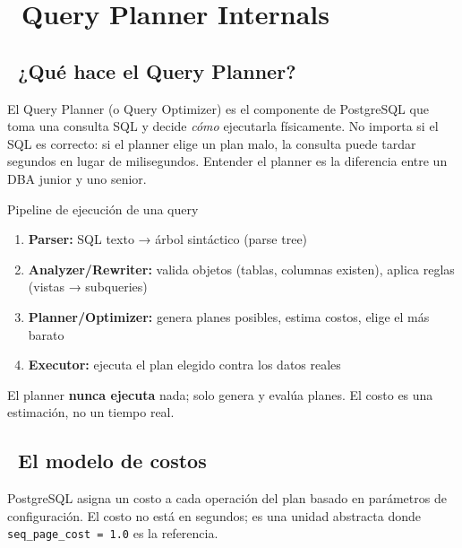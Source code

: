 \chapter[Query Planner Internals]{~Query Planner Internals}

\section[¿Qué hace el Query Planner?]{~¿Qué hace el Query Planner?}

El Query Planner (o Query Optimizer) es el componente de PostgreSQL que toma una consulta SQL y decide \emph{cómo} ejecutarla físicamente.
No importa si el SQL es correcto: si el planner elige un plan malo, la consulta puede tardar segundos en lugar de milisegundos.
Entender el planner es la diferencia entre un DBA junior y uno senior.

\begin{teoriabox}{Pipeline de ejecución de una query}
\begin{enumerate}
  \item \textbf{Parser:} SQL texto → árbol sintáctico (parse tree)
  \item \textbf{Analyzer/Rewriter:} valida objetos (tablas, columnas existen), aplica reglas (vistas → subqueries)
  \item \textbf{Planner/Optimizer:} genera planes posibles, estima costos, elige el más barato
  \item \textbf{Executor:} ejecuta el plan elegido contra los datos reales
\end{enumerate}
El planner \textbf{nunca ejecuta} nada; solo genera y evalúa planes. El costo es una estimación, no un tiempo real.
\end{teoriabox}

\section[El modelo de costos]{~El modelo de costos}

PostgreSQL asigna un costo a cada operación del plan basado en parámetros de configuración.
El costo no está en segundos; es una unidad abstracta donde \texttt{seq\_page\_cost = 1.0} es la referencia.

